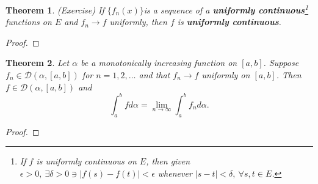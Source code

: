 \documentclass[12pt]{article}
\newtheorem{thm}{Theorem}[section]
\newcommand{\fseq}{$\{f_n(x)\}$}
\begin{document}
\begin{thm}
	(Exercise) If \fseq is a sequence of a \textbf{uniformly continuous}\footnote{If $f$ is uniformly continuous on $E$, then given $\epsilon > 0, ~ \exists \delta > 0 \ni |f(s) - f(t)| < \epsilon$ whenever $|s - t| < \delta, ~ \forall s, t \in E $.} functions on $E$ and $f_n \rightarrow f$ uniformly, then $f$ is \textbf{uniformly continuous}. 
\end{thm}
\begin{proof}
	
\end{proof}

\begin{thm}
	Let $\alpha$ be a monotonically increasing function on $[a, b]$. Suppose $f_n \in \mathcal{D}(\alpha, [a, b])$ for $n = 1, 2, \dots$ and that $f_n \rightarrow f$ uniformly on $[a, b]$. Then $f \in \mathcal{D}(\alpha, [a, b])$ and \[\int_a^b f d\alpha = \lim_{n \rightarrow \infty} \int_a^b f_n d\alpha.\]
\end{thm}
\begin{proof}
	
\end{proof}
\end{document}
